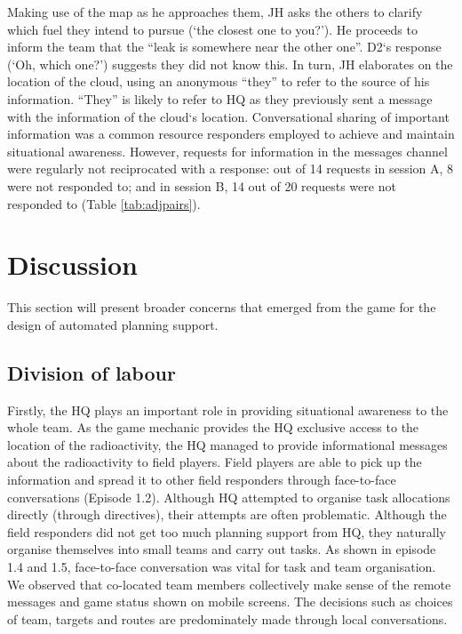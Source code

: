 Making use of the map as he approaches them, JH asks the others to clarify which fuel they intend to pursue (`the closest one to you?'). He proceeds to inform the team that the ``leak is somewhere near the other one''. D2`s response (`Oh, which one?') suggests they did not know this. In turn, JH elaborates on the location of the cloud, using an anonymous ``they'' to refer to the source of his information. ``They'' is likely to refer to HQ as they previously sent a message with the information of the cloud`s location. Conversational sharing of important information was a common resource responders employed to achieve and maintain situational awareness. However, requests for information in the messages channel were regularly not reciprocated with a response: out of 14 requests in session A, 8 were not responded to; and in session B, 14 out of 20 requests were not responded to (Table \ref{tab:adjpairs}).\\

\section{Discussion}
This section will present broader concerns that emerged from the game for the design of automated planning support.\\

\subsection{Division of labour}\label{sec:study1dlabour}
Firstly, the HQ plays an important role in providing situational awareness to the whole team. As the game mechanic provides the HQ exclusive access to the location of the radioactivity, the HQ managed to provide informational messages about the radioactivity to field players. Field players are able to pick up the information and spread it to other field responders through face-to-face conversations (Episode 1.2). Although HQ attempted to organise task allocations directly (through directives), their attempts are often problematic.  Although the field responders did not get too much planning support from HQ, they naturally organise themselves into small teams and carry out tasks. As shown in episode 1.4 and 1.5,  face-to-face conversation was vital for task and team organisation. We observed that co-located team members collectively make sense of the remote messages and game status shown on mobile screens. The decisions such as choices of team, targets and routes are  predominately made through local conversations.\\

